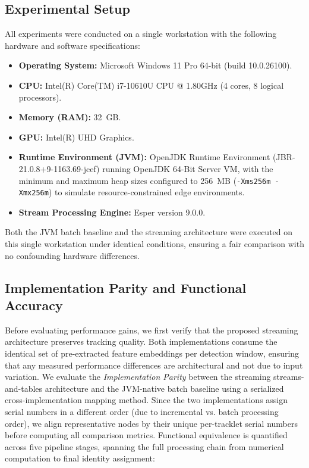 \documentclass[review]{elsarticle}
\begin{document}
\subsection{Experimental Setup}
All experiments were conducted on a single workstation with the following hardware and software specifications:
\begin{itemize}[leftmargin=*]
    \item \textbf{Operating System:} Microsoft Windows 11 Pro 64-bit (build 10.0.26100).
    \item \textbf{CPU:} Intel(R) Core(TM) i7-10610U CPU @ 1.80GHz (4 cores, 8 logical processors).
    \item \textbf{Memory (RAM):} 32~GB.
    \item \textbf{GPU:} Intel(R) UHD Graphics.
    \item \textbf{Runtime Environment (JVM):} OpenJDK Runtime Environment (JBR-21.0.8+9-1163.69-jcef) running OpenJDK 64-Bit Server VM, with the minimum and maximum heap sizes configured to 256~MB (\texttt{-Xms256m -Xmx256m}) to simulate resource-constrained edge environments.
    \item \textbf{Stream Processing Engine:} Esper version 9.0.0.
\end{itemize}
Both the JVM batch baseline and the streaming architecture were executed on this single workstation under identical conditions, ensuring a fair comparison with no confounding hardware differences.



\subsection{Implementation Parity and Functional Accuracy}
\label{sec:eval:parity}
Before evaluating performance gains, we first verify that the proposed streaming architecture preserves tracking quality. Both implementations consume the identical set of pre-extracted feature embeddings per detection window, ensuring that any measured performance differences are architectural and not due to input variation. We evaluate the \emph{Implementation Parity} between the streaming streams-and-tables architecture and the JVM-native batch baseline using a serialized cross-implementation mapping method. Since the two implementations assign serial numbers in a different order (due to incremental vs. batch processing order), we align representative nodes by their unique per-tracklet serial numbers before computing all comparison metrics. Functional equivalence is quantified across five pipeline stages, spanning the full processing chain from numerical computation to final identity assignment:
\end{document}
